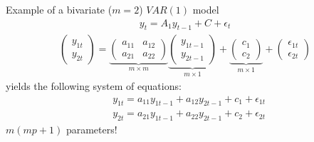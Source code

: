 \begin{frame}{Example of a bivariate ($m = 2$) $VAR(1)$ model}
    \begin{align*}
        y_t = A_1 y_{t - 1} + C + \epsilon_t
    \end{align*}
    \begin{align*}
        \begin{pmatrix}
            y_{1t}\\
            y_{2t}
        \end{pmatrix}
        =
        \underbrace{
            \begin{pmatrix}
                a_{11} & a_{12}\\
                a_{21} & a_{22}
            \end{pmatrix}
        }_{m \times m}
        \underbrace{
            \begin{pmatrix}
                y_{1t-1}\\
                y_{2t-1}
            \end{pmatrix}
        }_{m \times 1}
        +
        \underbrace{
            \begin{pmatrix}
                c_1\\
                c_2
            \end{pmatrix}
        }_{m \times 1}
        +
        \begin{pmatrix}
            \epsilon_{1t}\\
            \epsilon_{2t}
        \end{pmatrix}
    \end{align*}
    \centering yields the following system of equations:
    \begin{align*}
        &y_{1t} = a_{11} y_{1t-1} + a_{12} y_{2t-1} + c_1 + \epsilon_{1t}\\
        &y_{2t} = a_{21} y_{1t-1} + a_{22} y_{2t-1} + c_2 + \epsilon_{2t}
    \end{align*}
    \centering \alert{$m (mp + 1)$ parameters!}
\end{frame}

